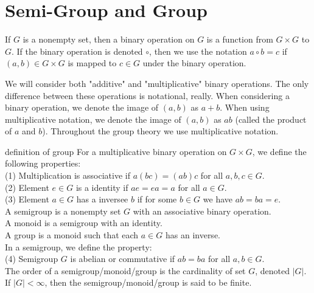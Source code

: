 \chapter{Semi-Group and Group}\label{chp:1_2}

\begin{definition}{}{}
    If $G$ is a nonempty set, 
    then a binary operation on $G$ is a function
    from $G \times G$ to $G$. 
    If the binary operation is denoted $\circ$, 
    then we use the notation
    $a \circ b = c$ 
    if $(a, b) \in G \times G$ is mapped to $c \in G$ 
    under the binary operation.
\end{definition}

\begin{remark}
    We will consider both "additive" and "multiplicative" binary operations.
    The only difference between these operations is notational, really. 
    When considering a binary operation, we denote the image of $(a, b)$ as $a + b$. 
    When using multiplicative notation, we denote the image of $(a, b)$ as $ab$ 
    (called the product of $a$ and $b$). 
    Throughout the group theory we use multiplicative notation.
\end{remark}

\begin{definition}{}{definition of group}
    For a multiplicative binary operation on $G\times G$,
    we define the following properties:\\
    (1) Multiplication is associative if $a(bc)=(ab)c$ for all $a,b,c\in G$.\\
    (2) Element $e\in G$ is a identity if $ae=ea=a$ for all $a\in G$.\\
    (3) Element $a\in G$ has a inversee $b$ 
    if for some $b\in G$ we have $ab=ba=e$.\\
    A semigroup is a nonempty set $G$ with an associative binary operation.\\
    A monoid is a semigroup with an identity.\\
    A group is a monoid such that each $a\in G$ has an inverse.\\
    In a semigroup, we define the property:\\
    (4) Semigroup $G$ is abelian or commutative if $ab=ba$ for all $a,b\in G$.\\
    The order of a semigroup/monoid/group is the cardinality of set $G$, denoted $|G|$.
    If $|G| < \infty$, then the semigroup/monoid/group is said to be finite.
\end{definition}

